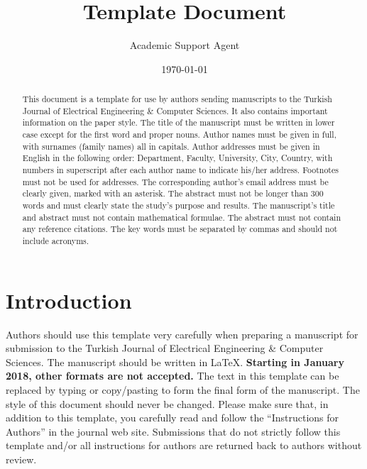 \documentclass{article}
\title{Template Document}
\author{Academic Support Agent}
\date{\today}
\begin{document}
\maketitle

\maketitle


\begin{abstract}This document is a template for use by authors sending manuscripts to the Turkish Journal of Electrical Engineering {\&} Computer Sciences. It also contains important information on the paper style. The title of the manuscript must be written in lower case except for the first word and proper nouns. Author names must be given in full, with surnames (family names) all in capitals. Author addresses must be given in English in the following order: Department, Faculty, University, City, Country, with numbers in superscript after each author name to indicate his/her address. Footnotes must not be used for addresses. The corresponding author's email address must be clearly given, marked with an asterisk. The abstract must not be longer than 300 words and must clearly state the study's purpose and results. The manuscript's title and abstract must not contain mathematical formulae. The abstract must not contain any reference citations. The key words must be separated by commas and should not include acronyms.

\end{abstract}

\section{Introduction}
\label{Int}

Authors should use this template very carefully when preparing a manuscript for submission to the Turkish Journal of Electrical Engineering {\&} Computer Sciences. The manuscript should be written in \LaTeX. \textbf{Starting in January 2018, other formats are not accepted.} The text in this template can be replaced by typing or copy/pasting to form the final form of the manuscript. The style of this document should never be changed. Please make sure that, in addition to this template, you carefully read and follow the ``Instructions for Authors'' in the journal web site. Submissions that do not strictly follow this template and/or all instructions for authors are returned back to authors without review.
\end{document}
